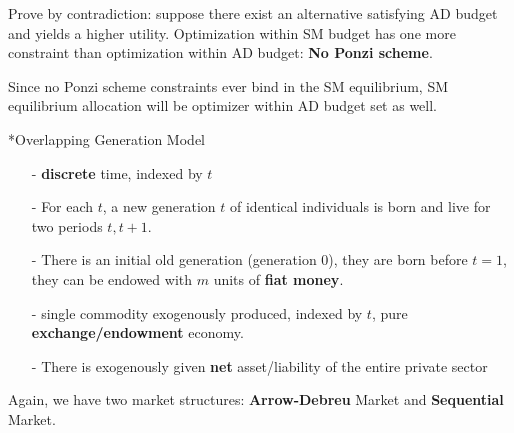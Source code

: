 \documentclass[10pt,landscape,a4paper]{article}
\makeatletter
\renewcommand{\section}{\@startsection{section}{1}{0mm}{1ex}{.2ex}{\normalsize\bfseries}}
\makeatother
\begin{document}
\begin{multicols*}{3}
\begin{itemize}
    Prove by contradiction: suppose there exist an alternative satisfying AD budget and yields a higher utility. Optimization within SM budget has one more constraint than optimization within AD budget: \textbf{No Ponzi scheme}.  
    
    Since no Ponzi scheme constraints ever bind in the SM equilibrium, SM equilibrium allocation will be optimizer within AD budget set as well.

\end{itemize}

\section*{Overlapping Generation Model}
\vspace{2pt}
\begin{itemize}
\item[-] \textbf{discrete} time, indexed by $t$
\item[-] For each $t$, a new generation $t$ of identical individuals is born and live for two periods $t,t+1$.
\item[-] There is an initial old generation (generation 0), they are born before $t=1$, they can be endowed with $m$ units of \textbf{fiat money}.
\item[-] single commodity exogenously produced, indexed by $t$, pure \textbf{exchange/endowment} economy.
\item[-] There is exogenously given \textbf{net} asset/liability of the entire private sector
\end{itemize}

\vspace{2pt}

\vspace{2pt}
Again, we have two market structures: \textbf{Arrow-Debreu} Market and \textbf{Sequential} Market.


\end{multicols*}
\end{document}
